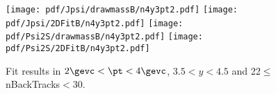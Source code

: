 \begin{figure}[H]
\begin{center}
\texttt{[image: pdf/Jpsi/drawmassB/n4y3pt2.pdf]}
\texttt{[image: pdf/Jpsi/2DFitB/n4y3pt2.pdf]}
\vspace*{-0.5cm}
\texttt{[image: pdf/Psi2S/drawmassB/n4y3pt2.pdf]}
\texttt{[image: pdf/Psi2S/2DFitB/n4y3pt2.pdf]}
\vspace*{-0.5cm}
\end{center}
\caption{Fit results in $2\gevc<\pt<4\gevc$, $3.5<y<4.5$ and 22$\leq$nBackTracks$<$30.}
\label{Fitn4y3pt2}
\end{figure}
